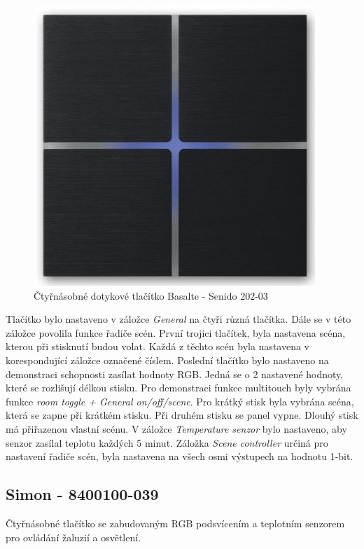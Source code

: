 \begin{figure}[!ht]
  \begin{center}
    \includegraphics[scale=0.4]{obrazky/Basalte.jpg}
  \end{center}
  \caption[Čtyřnásobné dotykové tlačítko Basalte - Senido 202-03 \cite{Basalte}]{Čtyřnásobné dotykové tlačítko Basalte - Senido 202-03 \cite{Basalte}}
  \label{fig:Čtyřnásobné dotykové tlačítko Basalte - Senido 202-03}
\end{figure}

Tlačítko bylo nastaveno v záložce \textit{General} na čtyři různá tlačítka. Dále se v této záložce povolila funkce řadiče scén. První trojici tlačítek, byla nastavena scéna, kterou při stisknutí budou volat.  Každá z těchto scén byla nastavena v korespondující záložce označené číslem. Poslední tlačítko bylo nastaveno na demonstraci schopnosti zasílat hodnoty RGB. Jedná se o 2 nastavené hodnoty, které se rozlišují délkou stisku. Pro demonstraci funkce multitouch byly vybrána funkce \textit{room toggle + General on/off/scene}. Pro krátký stisk byla vybrána scéna, která se zapne při krátkém stisku. Při druhém stisku se panel vypne. Dlouhý stisk má přiřazenou vlastní scénu. V záložce \textit{Temperature senzor} bylo nastaveno, aby senzor zasílal teplotu každých 5 minut. Záložka \textit{Scene controller} určiná pro nastavení řadiče scén, byla nastavena na všech osmi výstupech na hodnotu 1-bit.

\subsection{Simon - 8400100-039}
Čtyřnásobné tlačítko se zabudovaným RGB podsvícením a teplotním senzorem pro ovládání žaluzií a osvětlení. \cite{Simon}

